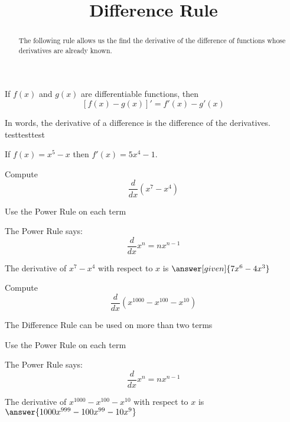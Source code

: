 \documentclass[handout]{ximera}
\title{Difference Rule}
\begin{document}
\begin{abstract}
The following rule allows us the find the derivative of the difference of functions 
whose derivatives are already known.
\end{abstract}


\maketitle

\begin{theorem} If $f(x)$ and $g(x)$ are differentiable functions, then
\[ [f(x) - g(x)]' =  f'(x) -  g'(x)\]
\end{theorem}

In words, the derivative of a difference is the difference of the derivatives.\\

testtesttest

\begin{example} %
 If $f(x) = x^5 - x$ then $f'(x) = 5x^4 - 1$.
\end{example}

\begin{problem} %
  Compute 
  \[
  \frac{d}{dx} \left(x^7 - x^4\right)
  \]
  
    \begin{hint}
      Use the Power Rule on each term
    \end{hint}
    \begin{hint}
      The Power Rule says:
      \[
      \frac{d}{dx} x^n = nx^{n-1}
      \]
    \end{hint}    
		The derivative of $x^7 - x^4$ with respect to $x$ is
		 $\answer[given]{7x^6 - 4x^3}$
	
\end{problem}

\begin{problem} %
  Compute 
  \[
  \frac{d}{dx} \left(x^{1000} - x^{100} - x^{10}\right)
  \]
  
    \begin{hint}
		  The Difference Rule can be used on more than two terms
		\end{hint}
		\begin{hint}
      Use the Power Rule on each term
    \end{hint}
    \begin{hint}
      The Power Rule says:
      \[
      \frac{d}{dx} x^n = nx^{n-1}
      \]
    \end{hint}    
		The derivative of $x^{1000} - x^{100} - x^{10}$ with respect to $x$ is
		 $\answer{1000x^{999} - 100x^{99} - 10x^9}$
	
\end{problem}
\end{document}
